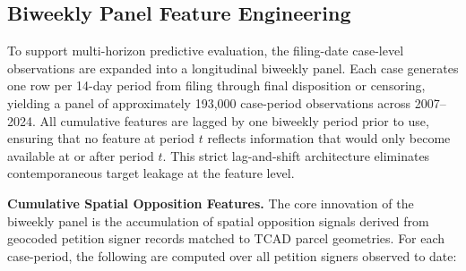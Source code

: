 \documentclass[11pt, letterpaper, oneside]{article}
\begin{document}
\begin{table}[!htbp]
\centering
\caption{Illustrative Cross-Section of the DML Panel}
\label{tab:panel_illustration}
\end{table}

\subsection{Biweekly Panel Feature Engineering}
\label{sec:biweekly_features}

To support multi-horizon predictive evaluation, the filing-date case-level observations are expanded into a longitudinal biweekly panel. Each case generates one row per 14-day period from filing through final disposition or censoring, yielding a panel of approximately 193,000 case-period observations across 2007--2024. All cumulative features are lagged by one biweekly period prior to use, ensuring that no feature at period $t$ reflects information that would only become available at or after period $t$. This strict lag-and-shift architecture eliminates contemporaneous target leakage at the feature level.

\textbf{Cumulative Spatial Opposition Features.} The core innovation of the biweekly panel is the accumulation of spatial opposition signals derived from geocoded petition signer records matched to TCAD parcel geometries. For each case-period, the following are computed over all petition signers observed to date:
\end{document}
